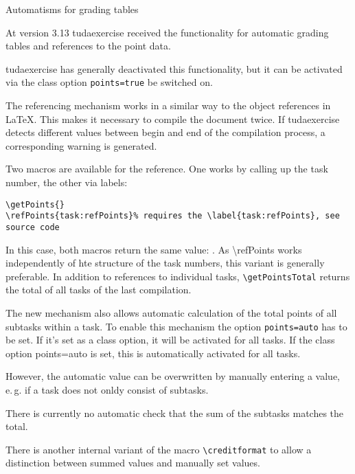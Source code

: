 \documentclass[
	english,%
	accentcolor=9c,%
	points=true, to activate referencing task properties
]{tudaexercise}
\newcommand*{\code}[1]{\texttt{#1}}
\newcommand*{\cls}[1]{\textsf{#1}}
\newcommand*{\option}[1]{\texttt{#1}}
\let\tbs\textbackslash
\begin{document}
\begin{task}[points=auto]{Automatisms for grading tables}
	\label{task:refPoints}

	At version 3.13 \cls{tudaexercise} received the functionality for automatic grading tables and references to the point data.

	\begin{subtask}[points=3,title={Activate references}]
		\cls{tudaexercise} has generally deactivated this functionality, but it can be activated via the class option \option{points=true} be switched on.

		The referencing mechanism works in a similar way to the object references in \LaTeX.
		This makes it necessary to compile the document twice.
		If \cls{tudaexercise} detects different values between begin and end of the compilation process, a corresponding warning is generated.

		Two macros are available for the reference.
		One works by calling up the task number, the other via labels:

		\verb+\getPoints{+\thetask\verb+}+\\
		\verb+\refPoints{task:refPoints}% requires the \label{task:refPoints}, see source code+

		In this case, both macros return the same value: .
		As {\tbs{}refPoints} works independently of hte structure of the task numbers, this variant is generally preferable.
		In addition to references to individual tasks, \verb+\getPointsTotal+ returns the total of all tasks of the last compilation.
	\end{subtask}

	\begin{subtask}[points=2,title={Summation among subtasks}]
		The new mechanism also allows automatic calculation of the total points of all subtasks within a task.
		To enable this mechanism the option \option{points=auto} has to be set.
		If it's set as a class option, it will be activated for all tasks.
		If the class option points=auto is set, this is automatically activated for all tasks.

		However, the automatic value can be overwritten by manually entering a value, e.\,g. if a task does not onldy consist of subtasks.

		There is currently no automatic check that the sum of the subtasks matches the total.

		There is another internal variant of the macro \code{\tbs{}creditformat} to allow a distinction between summed values
		and manually set values.


\end{subtask}
\end{task}
\end{document}
